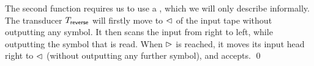 \begin{example}
%
%
The second function requires us to use a \FFT{}, which we will only describe
informally. The transducer $T_{\mathsf{reverse}}$ will firstly move to $\vartriangleleft$ of the input tape
    without outputting any symbol. It then scans the input from
    right to left, while outputting the symbol that is read.
    When $\vartriangleright$ is reached, it moves its input head right to $\vartriangleleft$ (without outputting any further symbol), and accepts.     \qed
\end{example}



